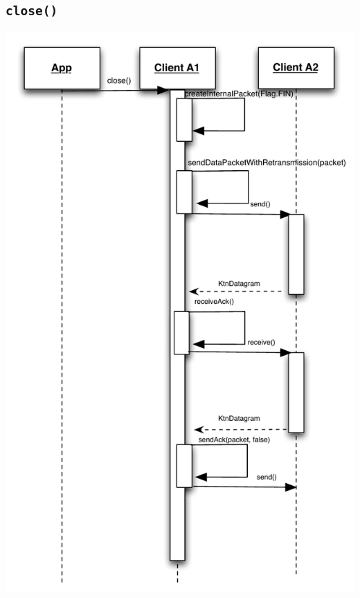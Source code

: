\documentclass{article}
\begin{document}
\subsection{\texttt{close()}}
\includegraphics[scale=0.8]{ktnClientClose.pdf}
\end{document}
